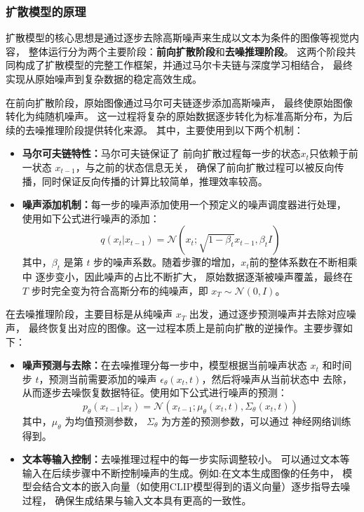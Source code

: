 \subsubsection{扩散模型的原理}
\par
扩散模型的核心思想是通过逐步去除高斯噪声来生成以文本为条件的图像等视觉内容，
整体运行分为两个主要阶段：{\bfseries 前向扩散阶段}和{\bfseries 去噪推理阶段}。
这两个阶段共同构成了扩散模型的完整工作框架，并通过马尔卡夫链与深度学习相结合，
最终实现从原始噪声到复杂数据的稳定高效生成\cite{ho2020denoising}。
\par
在前向扩散阶段，原始图像通过马尔可夫链逐步添加高斯噪声，
最终使原始图像转化为纯随机噪声。
这一过程将复杂的原始数据逐步转化为标准高斯分布，为后续的去噪推理阶段提供转化来源。
其中，主要使用到以下两个机制：
\begin{itemize}
    \item {\bfseries 马尔可夫链特性：}马尔可夫链保证了
    前向扩散过程每一步的状态$x_{t}$只依赖于前一状态 $x_{t-1}$，与之前的状态信息无关，
    确保了前向扩散过程可以被反向传播，同时保证反向传播的计算比较简单，推理效率较高\cite{Zekri2024LargeLM}。
    \item {\bfseries 噪声添加机制：}每一步的噪声添加使用一个预定义的噪声调度器进行处理，
    使用如下公式进行噪声的添加\cite{ho2020denoising}：
    \begin{equation}
    q(x_t | x_{t-1}) = \mathcal{N}(x_t; \sqrt{1-\beta_t} x_{t-1}, \beta_t I)
    \end{equation}
    其中，$\beta_t$ 是第 $t$ 步的噪声系数。随着步骤的增加，$x_{t}$前的整体系数在不断相乘中
    逐步变小，因此噪声的占比不断扩大，
    原始数据逐渐被噪声覆盖，最终在 $T$ 步时完全变为符合高斯分布的纯噪声，即
    $x_T \sim \mathcal{N}(0, I)$。
\end{itemize}
\par
在去噪推理阶段，主要目标是从纯噪声 $x_T$ 出发，通过逐步预测噪声并去除对应噪声，
最终恢复出对应的图像。这一过程本质上是前向扩散的逆操作。主要步骤如下：
\begin{itemize}
    \item {\bfseries 噪声预测与去除：}在去噪推理分每一步中，模型根据当前噪声状态 $x_t$ 
    和时间步 $t$，预测当前需要添加的噪声 $\epsilon_\theta(x_t, t)$，然后将噪声从当前状态中
    去除，从而逐步去噪恢复数据特征。使用如下公式进行噪声的预测\cite{ho2020denoising}：
    \begin{equation}
        p_\theta(x_{t-1} | x_t) = \mathcal{N}(x_{t-1}; \mu_\theta(x_t, t), \Sigma_\theta(x_t, t))
    \end{equation}
    其中，$\mu_\theta$ 为均值预测参数， $\Sigma_\theta$ 为方差的预测参数，可以通过
    神经网络训练得到。
    \item {\bfseries 文本等输入控制：}去噪推理过程中的每一步实际调整较小。
    可以通过文本等输入在后续步骤中不断控制噪声的生成。例如:在文本生成图像的任务中，
    模型会结合文本的嵌入向量（如使用CLIP模型得到的语义向量）逐步指导去噪过程，
    确保生成结果与输入文本具有更高的一致性\cite{rombach2022high, Radford2021LearningTV, Liu2024TowardsUC}。
\end{itemize}
